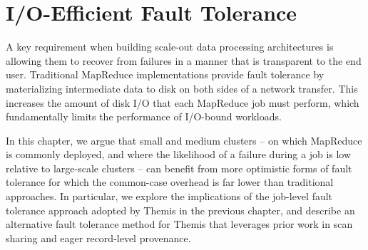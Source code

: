\def\themis{Themis\xspace}

\chapter{I/O-Efficient Fault Tolerance}
\label{chapter:fault_tolerance}

A key requirement when building scale-out data processing architectures is
allowing them to recover from failures in a manner that is transparent to the
end user. Traditional MapReduce implementations provide fault tolerance by
materializing intermediate data to disk on both sides of a network
transfer. This increases the amount of disk I/O that each MapReduce job must
perform, which fundamentally limits the performance of I/O-bound workloads.

In this chapter, we argue that small and medium clusters -- on which MapReduce
is commonly deployed, and where the likelihood of a failure during a job is low
relative to large-scale clusters -- can benefit from more optimistic forms of
fault tolerance for which the common-case overhead is far lower than
traditional approaches. In particular, we explore the implications of the
job-level fault tolerance approach adopted by Themis in the previous chapter,
and describe an alternative fault tolerance method for Themis that leverages
prior work in scan sharing and eager record-level provenance.








